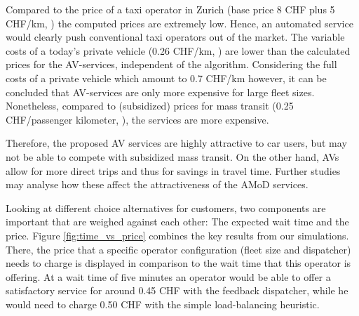 Compared to the price of a taxi operator in Zurich (base price 8 CHF plus 5 CHF/km, \cite{StadtZurich2014})
the computed prices are extremely low. Hence, an automated service would clearly
push conventional taxi operators out of the market. The variable costs of a today's private vehicle (0.26 CHF/km, \cite{TCS2016}) are lower than the calculated prices for the AV-services, independent of the algorithm. Considering the full costs of a private vehicle which amount to 0.7 CHF/km \cite{TCS2016} however, it can be concluded that AV-services are only more expensive for large fleet sizes. Nonetheless, compared to
(subsidized) prices for mass transit (0.25 CHF/passenger kilometer, \cite{Bosch2016a}), the services are more
expensive.

Therefore, the proposed AV services are highly attractive to car users, but may
not be able to compete with subsidized mass transit. On the other hand, AVs
allow for more direct trips and thus for savings in travel time. Further studies
may analyse how these affect the attractiveness of the AMoD services.

Looking at different choice alternatives for customers, two components are important
that are weighed against each other: The expected wait time and the price. Figure
\ref{fig:time_vs_price} combines the key results from our simulations. There,
the price that a specific operator configuration (fleet size and dispatcher)
needs to charge is
displayed in comparison to the wait time that this operator is offering.
At a wait time of five minutes an operator would be able to offer a satisfactory service
for around 0.45 CHF with the feedback dispatcher, while he would need to charge
0.50 CHF with the simple load-balancing heuristic.

